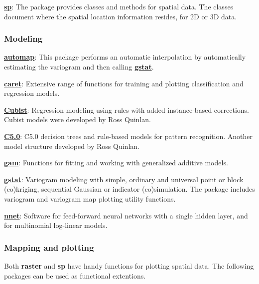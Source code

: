 \documentclass[10pt,b5paper,]{book}
\theoremstyle{definition}
\theoremstyle{definition}
\theoremstyle{definition}
\theoremstyle{remark}
\begin{document}
\href{https://CRAN.R-project.org/package=sp}{\textbf{sp}}: The package
provides classes and methods for spatial data. The classes document
where the spatial location information resides, for 2D or 3D data.

\hypertarget{modeling}{%
\subsubsection{Modeling}\label{modeling}}

\href{https://CRAN.R-project.org/package=automap}{\textbf{automap}}:
This package performs an automatic interpolation by automatically
estimating the variogram and then calling
\href{https://CRAN.R-project.org/package=gstat}{\textbf{gstat}}.

\href{https://CRAN.R-project.org/package=caret}{\textbf{caret}}:
Extensive range of functions for training and plotting classification
and regression models.

\href{https://CRAN.R-project.org/package=Cubist}{\textbf{Cubist}}:
Regression modeling using rules with added instance-based corrections.
Cubist models were developed by Ross Quinlan.

\href{https://CRAN.R-project.org/package=C5.0}{\textbf{C5.0}}: C5.0
decision trees and rule-based models for pattern recognition. Another
model structure developed by Ross Quinlan.

\href{https://CRAN.R-project.org/package=gam}{\textbf{gam}}: Functions
for fitting and working with generalized additive models.

\href{https://CRAN.R-project.org/package=gstat}{\textbf{gstat}}:
Variogram modeling with simple, ordinary and universal point or block
(co)kriging, sequential Gaussian or indicator (co)simulation. The
package includes variogram and variogram map plotting utility functions.

\href{https://CRAN.R-project.org/package=nnet}{\textbf{nnet}}: Software
for feed-forward neural networks with a single hidden layer, and for
multinomial log-linear models.

\hypertarget{mapping-and-plotting}{%
\subsubsection{Mapping and plotting}\label{mapping-and-plotting}}

Both \textbf{raster} and \textbf{sp} have handy functions for plotting
spatial data. The following packages can be used as functional
extentions.
\end{document}
